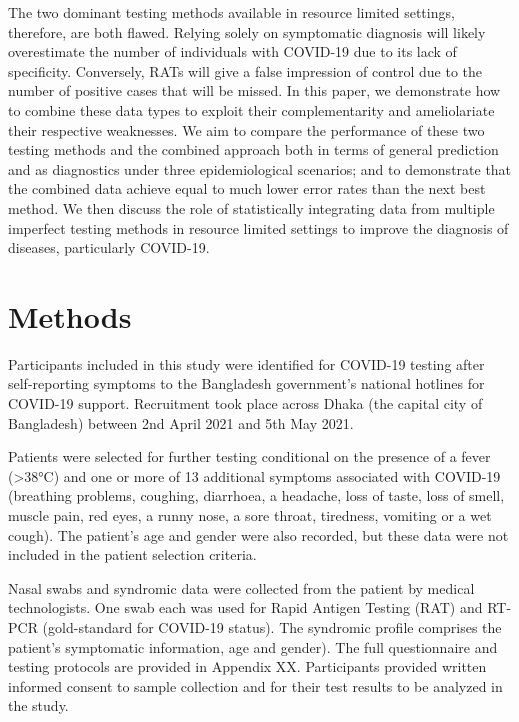 \documentclass[]{elsarticle} %
\begin{document}
The two dominant testing methods available in resource limited settings,
therefore, are both flawed. Relying solely on symptomatic diagnosis will
likely overestimate the number of individuals with COVID-19 due to its
lack of specificity. Conversely, RATs will give a false impression of
control due to the number of positive cases that will be missed. In this
paper, we demonstrate how to combine these data types to exploit their
complementarity and ameliolariate their respective weaknesses. We aim to
compare the performance of these two testing methods and the combined
approach both in terms of general prediction and as diagnostics under
three epidemiological scenarios; and to demonstrate that the combined
data achieve equal to much lower error rates than the next best method.
We then discuss the role of statistically integrating data from multiple
imperfect testing methods in resource limited settings to improve the
diagnosis of diseases, particularly COVID-19.

\hypertarget{methods}{%
\section{Methods}\label{methods}}

Participants included in this study were identified for COVID-19 testing
after self-reporting symptoms to the Bangladesh government's national
hotlines for COVID-19 support. Recruitment took place across Dhaka (the
capital city of Bangladesh) between 2nd April 2021 and 5th May 2021.

Patients were selected for further testing conditional on the presence
of a fever (\textgreater38°C) and one or more of 13 additional symptoms
associated with COVID-19 (breathing problems, coughing, diarrhoea, a
headache, loss of taste, loss of smell, muscle pain, red eyes, a runny
nose, a sore throat, tiredness, vomiting or a wet cough). The patient's
age and gender were also recorded, but these data were not included in
the patient selection criteria.

Nasal swabs and syndromic data were collected from the patient by
medical technologists. One swab each was used for Rapid Antigen Testing
(RAT) and RT-PCR (gold-standard for COVID-19 status). The syndromic
profile comprises the patient's symptomatic information, age and
gender). The full questionnaire and testing protocols are provided in
Appendix XX. Participants provided written informed consent to sample
collection and for their test results to be analyzed in the study.
\end{document}
